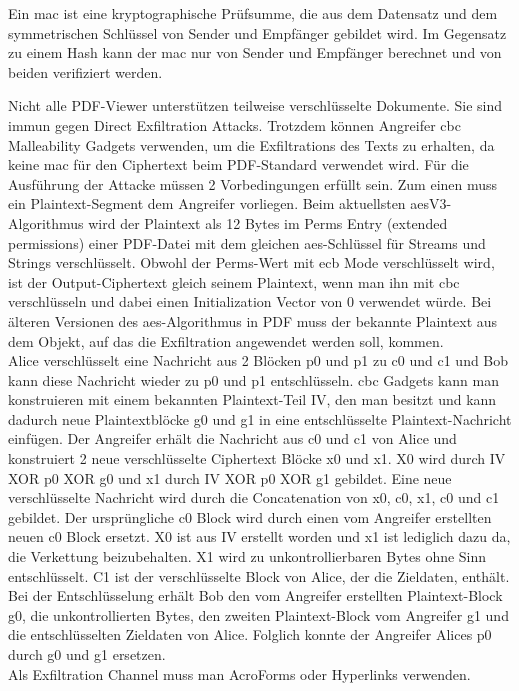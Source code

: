 Ein \gls{mac} ist eine kryptographische Prüfsumme, die aus dem Datensatz und dem symmetrischen Schlüssel von Sender und Empfänger gebildet wird. Im Gegensatz zu einem Hash kann der \gls{mac} nur von Sender und Empfänger berechnet und von beiden verifiziert werden. \cite{crypto-web}
\par
Nicht alle PDF-Viewer unterstützen teilweise verschlüsselte Dokumente. Sie sind immun gegen Direct Exfiltration Attacks. Trotzdem können Angreifer \gls{cbc} Malleability Gadgets verwenden, um die Exfiltrations des Texts zu erhalten, da keine \gls{mac} für den Ciphertext beim PDF-Standard verwendet wird. Für die Ausführung der Attacke müssen 2 Vorbedingungen erfüllt sein. Zum einen muss ein Plaintext-Segment dem Angreifer vorliegen. Beim aktuellsten \gls{aes}V3-Algorithmus wird der Plaintext als 12 Bytes im Perms Entry (extended permissions) einer PDF-Datei mit dem gleichen \gls{aes}-Schlüssel für Streams und Strings verschlüsselt. Obwohl der Perms-Wert mit \gls{ecb} Mode verschlüsselt wird, ist der Output-Ciphertext gleich seinem Plaintext, wenn man ihn mit \gls{cbc} verschlüsseln und dabei einen Initialization Vector von 0 verwendet würde. Bei älteren Versionen des \gls{aes}-Algorithmus in PDF muss der bekannte Plaintext aus dem Objekt, auf das die Exfiltration angewendet werden soll, kommen. \\
Alice verschlüsselt eine Nachricht aus 2 Blöcken p0 und p1 zu c0 und c1 und Bob kann diese Nachricht wieder zu p0 und p1 entschlüsseln. \gls{cbc} Gadgets kann man konstruieren mit einem bekannten Plaintext-Teil IV, den man besitzt und kann dadurch neue Plaintextblöcke g0 und g1 in eine entschlüsselte Plaintext-Nachricht einfügen. Der Angreifer erhält die Nachricht aus c0 und c1 von Alice und konstruiert 2 neue verschlüsselte Ciphertext Blöcke x0 und x1. X0 wird durch IV XOR p0 XOR g0 und x1 durch IV XOR p0 XOR g1 gebildet. Eine neue verschlüsselte Nachricht wird durch die Concatenation von x0, c0, x1, c0 und c1 gebildet. Der ursprüngliche c0 Block wird durch einen vom Angreifer erstellten neuen c0 Block ersetzt. X0 ist aus IV erstellt worden und x1 ist lediglich dazu da, die Verkettung beizubehalten. X1 wird zu unkontrollierbaren Bytes ohne Sinn entschlüsselt. C1 ist der verschlüsselte Block von Alice, der die Zieldaten, enthält. Bei der Entschlüsselung erhält Bob den vom Angreifer erstellten Plaintext-Block g0, die unkontrollierten Bytes, den zweiten Plaintext-Block vom Angreifer g1 und die entschlüsselten Zieldaten von Alice. Folglich konnte der Angreifer Alices p0 durch g0 und g1 ersetzen. \\
Als Exfiltration Channel muss man AcroForms oder Hyperlinks verwenden.